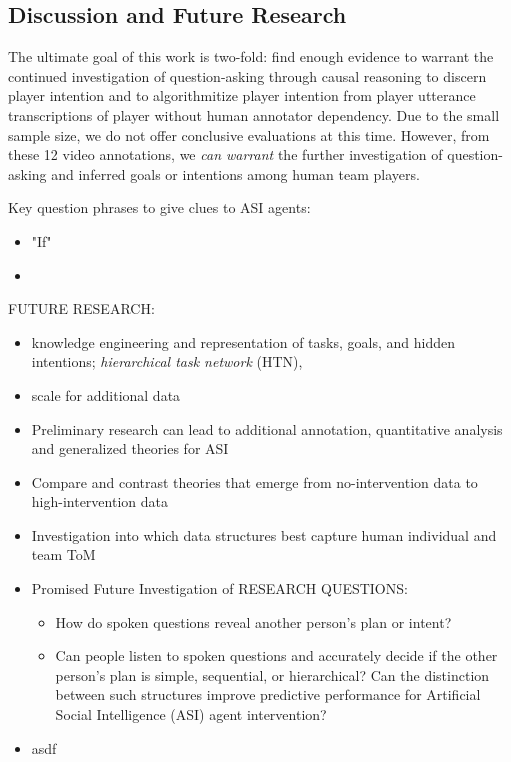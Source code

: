 \documentclass[10pt]{article}
\begin{document}
\subsection{Discussion and Future Research}
The ultimate goal of this work is two-fold: find enough evidence to warrant the continued investigation of question-asking through causal reasoning to discern player intention and to algorithmitize player intention from player utterance transcriptions of player without human annotator dependency. Due to the small sample size, we do not offer conclusive evaluations at this time. However, from these 12 video annotations, we \emph{can warrant} the further investigation of question-asking and inferred goals or intentions among human team players.

Key question phrases to give clues to ASI agents:
\begin{itemize}
    \item "If"
    \item
\end{itemize}



FUTURE RESEARCH:
\begin{itemize}
    \item knowledge engineering and representation of tasks, goals, and hidden intentions;  \emph{hierarchical task network} (HTN),
    \item scale for additional data
    \item Preliminary research can lead to additional annotation, quantitative analysis and generalized theories for ASI
    \item Compare and contrast theories that emerge from no-intervention data to high-intervention data
    \item Investigation into which data structures best capture human individual and team ToM
        \item Promised Future Investigation of RESEARCH QUESTIONS:
        \begin{itemize}
            \item How do spoken questions reveal another person’s plan or intent? 
            \item Can people listen to spoken questions and accurately decide if the other person's plan
        is simple, sequential, or hierarchical? Can the distinction between such
        structures improve predictive performance for Artificial Social
        Intelligence (ASI) agent intervention?
        \end{itemize}
        \item asdf
\end{itemize}






\newpage

\raggedright
\end{document}
